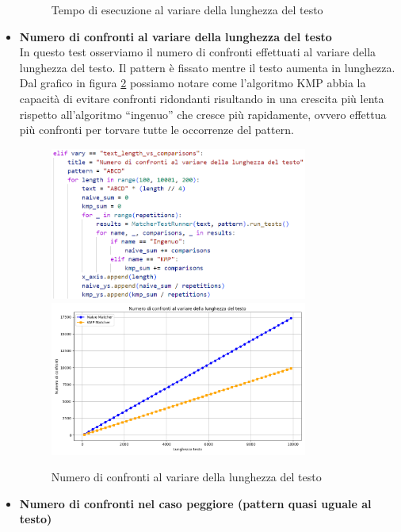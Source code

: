 \documentclass{article}
\begin{document}
\begin{itemize}
\begin{figure}[H]
            \caption{Tempo di esecuzione al variare della lunghezza del testo}
            \label{fig:test-1}
        \end{figure}
    \newpage
    \item \textbf{Numero di confronti al variare della lunghezza del testo}\\
        In questo test osserviamo il numero di confronti effettuati al variare della lunghezza del testo. Il pattern è fissato mentre il testo aumenta in lunghezza. Dal grafico in figura \ref{fig:test-2} possiamo notare come l'algoritmo KMP abbia la capacità di evitare confronti ridondanti risultando in una crescita più lenta rispetto all'algoritmo ``ingenuo'' che cresce più rapidamente, ovvero effettua più confronti per torvare tutte le occorrenze del pattern.
        \begin{figure}[H]
            \centering
            \includegraphics[width=0.8\textwidth]{img/Test2.png}
            \includegraphics[width=0.8\textwidth]{img/Graph2.png}
            \caption{Numero di confronti al variare della lunghezza del testo}
            \label{fig:test-2}
        \end{figure}
    \newpage
    \item \textbf{Numero di confronti nel caso peggiore (pattern quasi uguale al testo)}\\

\end{itemize}
\end{document}
